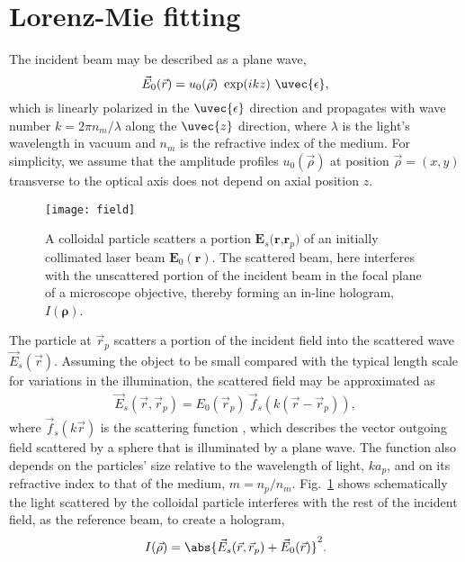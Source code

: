\section{Lorenz-Mie fitting}
The incident beam may be described as a plane wave, 
\begin{equation} 
\label{incident}
\vec{E}_0(\vec{r}) = u_0(\vec{\rho}) \ \exp(i k z)\ \uvec{\epsilon},    
\end{equation}
which is linearly polarized in the $\uvec{\epsilon}$ direction and propagates with wave number $k = 2\pi n_m / \lambda$ along 
the $\uvec{z}$ direction, where $\lambda$ is the light's wavelength in vacuum and $n_m$ is the refractive index of the medium. For simplicity, we assume that the amplitude profiles $u_0(\vec{\rho})$ at position $\vec{\rho} = (x,y)$ transverse to the optical axis does not depend on axial position $z$.

\begin{figure}[b!]
  \centering
  \texttt{[image: field]}
  \caption[Principle of holographic video microscopy]{A colloidal particle scatters a portion ${\boldsymbol{E}}_{s}({\boldsymbol{r}}$,${\boldsymbol{r}}_{p})$ of an initially collimated laser beam ${\boldsymbol{E}}_{0}({\boldsymbol{r}})$. The scattered beam, here interferes with the unscattered portion of the incident beam in the focal plane of a microscope objective, thereby forming an in-line hologram, $I({\boldsymbol{\rho}})$.}
  \label{fig:field}
\end{figure}

The particle at $\vec{r}_p$ scatters a portion of the incident field into the scattered wave $\vec{E}_s(\vec{r})$.
Assuming the object to be small compared with the typical length scale for variations in the illumination, the scattered field may be approximated as
\begin{align} 
\label{scatteredwave}
\vec{E}_s(\vec{r}, \vec{r}_p) = E_0(\vec{r}_p) \ 
\vec{f}_s(k(\vec{r} - \vec{r}_p)),
\end{align}
where $\vec{f}_s(k \vec{r})$ is the scattering function \cite{bohren83,barber90,mishchenko02},
which describes the vector outgoing field scattered by a sphere that is illuminated by a plane wave. The function also depends on the particles' size relative to the wavelength of light, $k a_p$, and on its refractive index to that of the medium, $m = n_p/n_m$.
Fig.~\ref{fig:field} shows schematically the light scattered by the colloidal particle interferes with the rest of the incident field, as the reference beam, to create a hologram,
\begin{align}
\label{interference}
   I(\vec{\rho}) = \abs{\vec{E}_s(\vec{r}, \vec{r}_p) +
                   \vec{E}_0(\vec{r})}^2.
\end{align}

